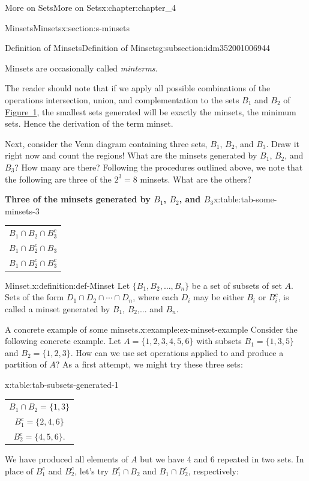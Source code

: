 \documentclass[oneside,10pt,]{book}
\newcommand{\tabularfont}{\relax}
\begin{document}
\begin{chapterptx}{More on Sets}{}{More on Sets}{}{}{x:chapter:chapter_4}
\begin{sectionptx}{Minsets}{}{Minsets}{}{}{x:section:s-minsets}
\begin{subsectionptx}{Definition of Minsets}{}{Definition of Minsets}{}{}{g:subsection:idm352001006944}
\par
Minsets are occasionally called \emph{minterms}.%
\par
The reader should note that if we apply all possible combinations of the operations intersection, union, and complementation to the sets \(B_1\) and \(B_2\) of \hyperref[x:figure:fig-minsets-2]{Figure~1}, the smallest sets generated will be exactly the minsets, the minimum sets. Hence the derivation of the term minset.%
\par
Next, consider the Venn diagram containing three sets, \(B_1\), \(B_2\), and \(B_3\). Draw it right now and count the regions! What are the minsets generated by \(B_1\), \(B_2\), and \(B_3\)? How many are there? Following the procedures outlined above, we note that the following are three of the \(2^3=8\) minsets. What are the others?%
\begin{tableptx}{\textbf{Three of the minsets generated by \(B_1\), \(B_2\), and \(B_3\)}}{x:table:tab-some-minsets-3}{}%
\centering
{\tabularfont%
\begin{tabular}{c}
\(B_1\cap B_2\cap B_3^c\)\tabularnewline[0pt]
\(B_1\cap B_2^c\cap B_3\)\tabularnewline[0pt]
\(B_1\cap B_2^c\cap B_3^c\)
\end{tabular}
}%
\end{tableptx}%
\begin{definition}{Minset.}{x:definition:def-Minset}%
%
Let \(\{B_1, B_2,\ldots,B_n\}\) be a set of subsets of  set \(A\). Sets of the form \(D_1\cap D_2\cap
\cdots \cap D_n\), where each \(D_i\) may be either \(B_i\) or \(B_i^c\), is called a minset generated by \(B_1\), \(B_2\),... and  \(B_n\).%
\end{definition}
\begin{example}{A concrete example of some minsets.}{x:example:ex-minset-example}%
Consider the following concrete example. Let \(A = \{1, 2, 3, 4, 5, 6\}\) with subsets \(B_1 = \{1,3,5\}\) and \(B_2= \{1,2,3\}\). How can we use set operations applied to and produce a partition of \(A\)? As a first attempt, we might try these three sets:%
\begin{tableptx}{\textbf{}}{x:table:tab-subsets-generated-1}{}%
\centering
{\tabularfont%
\begin{tabular}{c}
\(B_1\cap B_2=\{1,3\}\)\tabularnewline[0pt]
\(B_1^c=\{2,4,6\}\)\tabularnewline[0pt]
\(B_2^c=\{4,5,6\}\).
\end{tabular}
}%
\end{tableptx}%
We have produced all elements of \(A\) but we have 4 and 6 repeated in two sets. In place of \(B_1^c\) and \(B_2^c\), let's try \(B_1^c\cap B_2\) and \(B_1\cap B_2^c\), respectively:%

\end{example}
\end{subsectionptx}
\end{sectionptx}
\end{chapterptx}
\end{document}
